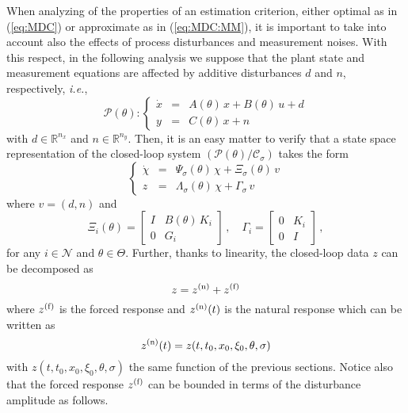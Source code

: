 \documentclass[letterpaper, 10 pt, conference]{ieeetran}
\begin{document}
When analyzing of the properties of an estimation criterion, either optimal as in (\ref{eq:MDC}) or approximate as in (\ref{eq:MDC:MM}),
it is important to take into account also the effects of process disturbances and measurement noises. With this respect, in the following analysis we suppose that the
plant state and measurement equations are
affected by additive disturbances $d$ and $n$,
 respectively, \emph{i.e.},
\begin{equation}
\mathcal P(\theta) : \left \{ \begin{array}{rcl} \dot x & =
& A(\theta) \, x + B(\theta) \,
u + d \\
y & = &  C(\theta) \, x + n
\end{array} \right . \label{equazione:sistema:rumore}
\end{equation}
with $d \in \mathbb R^{n_x}$ and $n \in \mathbb R^{n_y}$.
Then, it is an easy matter to verify that a state space
representation of the closed-loop system 
$(\mathcal P(\theta)/\mathcal C_\sigma) $ takes the form
\begin{equation}
 \left \{
\begin{array}{rcl} \dot \chi & = & \Psi_{\sigma}(\theta) \, \chi + \Xi_{\sigma} (\theta) \, v  \\
z & = &  \Lambda_{\sigma} (\theta) \, \chi +
\Gamma_{\sigma} \, v
\end{array} \right . \label{equazione:feedback:rumore}
\end{equation}
where $v = (d,n)$ and
\[
 \Xi_{i} (\theta)  = \left [ \begin{array}{cc} I & B(\theta) \, K_i
\\ 0 & G_i
\end{array} \right ] \, , \quad \Gamma_i = \left [
\begin{array}{cc} 0 & K_i  
\\  0 & I \end{array} \right ] \, ,
\]
for any $i \in {\mathcal N} $ and $\theta \in \Theta$.
Further, thanks to linearity, the
closed-loop data $z$ can be decomposed as
\begin{equation} \label{eq:decomposition}
z = z^{({\rm n})}  + z^{({\rm f})}
\end{equation}
where $z^{({\rm f})}$ is the forced response and $z^{({\rm n})} (t)$ is the natural response
which can be written as
\[
z^{({\rm n})} (t) =  z(t,t_0, x_0, \xi_0, \theta,\sigma) 
\]
with $z(t,t_0, x_0, \xi_0, \theta,\sigma)$  the same function of the previous sections.
Notice also that the forced response $z^{({\rm f})}$ can be bounded in terms of the disturbance amplitude as follows. 
\end{document}
